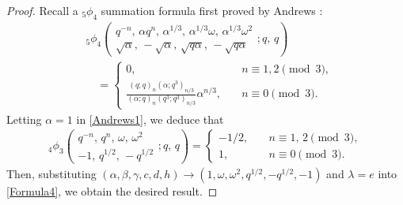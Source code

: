 \documentclass[reqno,12pt]{amsart}
\theoremstyle{remark}
\numberwithin{equation}{section}
\begin{document}
\begin{proof}
Recall a $_5\phi_4$ summation formula first proved by Andrews \cite{Andrews}:
\begin{align}
&{_5\phi_4}\left(\begin{array}{ccccc}
q^{-n},\,\alpha q^n,\,\alpha^{1/3},\,\alpha^{1/3}\omega,\,\alpha^{1/3}\omega^2\\
\sqrt{\alpha},\,-\sqrt{\alpha},\,\sqrt{q\alpha},\,-\sqrt{q\alpha}
\end{array};q,\,q
\right)\nonumber\\
&\quad=\left\{
\begin{array}{ll}
0,&\quad n\equiv1,2\pmod3,\\
\frac{\left(q;q\right)_n\left(\alpha;q^3\right)_{n/3}}
{\left(\alpha;q\right)_{n}\left(q^3;q^3\right)_{n/3}}\alpha^{n/3},&\quad n\equiv0\pmod3.
\end{array}
\right.\label{Andrews1}
\end{align}
Letting $\alpha=1$ in \eqref{Andrews1}, we deduce that
\begin{align}
{_4\phi_3}\left(
\begin{array}{cccc}
q^{-n},\,q^n,\,\omega,\,\omega^2\\
-1,\,q^{1/2},\,-q^{1/2}
\end{array};q,\,q\right)
=\left\{
\begin{array}{ll}
-1/2,&\quad n\equiv1,\,2\pmod3,\\
1,&\quad n\equiv0\pmod3.
\end{array}\right.\label{A3}
\end{align}
Then, substituting $\left(\alpha, \beta,\gamma,c,d,h\right)
\to\left(1,\omega,\omega^2,q^{1/2},-q^{1/2},-1\right)$ and $\lambda=e$ into \eqref{Formula4}, we obtain the desired result.
\end{proof}
\end{document}
